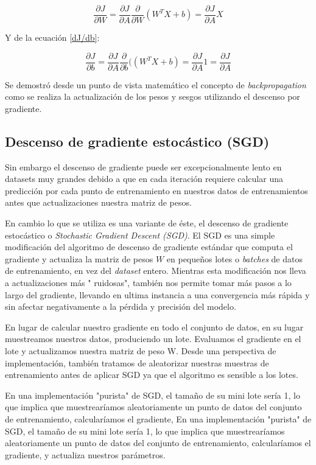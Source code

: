 \documentclass[14.5pt,a4paper]{article}
\begin{document}
\begin{equation}
\frac{\partial J}{\partial W} = \frac{\partial J}{\partial A} \frac{\partial}{\partial W}(W^T X + b) = \frac{\partial J}{\partial A} X
\end{equation}

Y de la ecuación \ref{dJ/db}:

\begin{equation}
\frac{\partial J}{\partial b} = \frac{\partial J}{\partial A} \frac{\partial}{\partial b}((W^T X + b) = \frac{\partial J}{\partial A} 1 = \frac{\partial J}{\partial A}
\end{equation}

Se demostró desde un punto de vista matemático el concepto de \textit{backpropagation} como se realiza la actualización de los pesos y sesgos utilizando el descenso por gradiente.

\subsection{Descenso de gradiente estocástico (SGD)}
Sin embargo el descenso de gradiente puede ser excepcionalmente lento en datasets muy grandes debido a que en cada iteración requiere calcular una predicción por cada punto de entrenamiento en nuestros datos de entrenamientos antes que actualizaciones nuestra matriz de pesos.

En cambio lo que se utiliza es una variante de éste, el descenso de gradiente estocástico o \textit{Stochastic Gradient Descent (SGD)}.
El SGD es una simple modificación del algoritmo de descenso de gradiente estándar que computa el gradiente y actualiza la matriz de pesos $W$ en pequeños lotes o \textit{batches} de datos de entrenamiento, en vez del \textit{dataset} entero. Mientras esta modificación nos lleva a actualizaciones más " ruidosas", también nos permite tomar más pasos a lo largo del gradiente, llevando en ultima instancia a una convergencia más rápida y sin afectar negativamente a la pérdida y precisión del modelo.

En lugar de calcular nuestro gradiente en todo el conjunto de datos, en su lugar muestreamos nuestros datos, produciendo un lote. Evaluamos el gradiente en el lote y actualizamos nuestra matriz de peso W. Desde una perspectiva de implementación, también tratamos de aleatorizar nuestras muestras de entrenamiento antes de aplicar SGD ya que el algoritmo es sensible a los lotes.

En una implementación "purista" de SGD, el tamaño de su mini lote sería 1,
lo que implica que muestrearíamos aleatoriamente un punto de datos del conjunto de entrenamiento, calcularíamos el gradiente, En una implementación "purista" de SGD, el tamaño de su mini lote sería 1, lo que implica que muestrearíamos aleatoriamente un punto de datos del conjunto de entrenamiento, calcularíamos el gradiente,
y actualiza nuestros parámetros.
\end{document}
